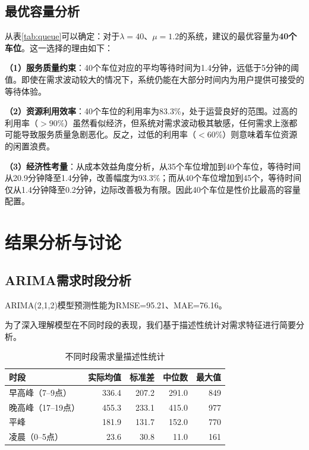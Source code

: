 \documentclass[12pt,a4paper]{article}
\begin{document}
\subsection{最优容量分析}

从表\ref{tab:queue}可以确定：对于$\lambda=40$、$\mu=1.2$的系统，建议的最优容量为\textbf{40个车位}。这一选择的理由如下：

\textbf{（1）服务质量约束}：40个车位对应的平均等待时间为1.4分钟，远低于5分钟的阈值。即使在需求波动较大的情况下，系统仍能在大部分时间内为用户提供可接受的等待体验。

\textbf{（2）资源利用效率}：40个车位的利用率为83.3\%，处于运营良好的范围。过高的利用率（$>90\%$）虽然看似经济，但系统对需求波动极其敏感，任何需求上涨都可能导致服务质量急剧恶化。反之，过低的利用率（$<60\%$）则意味着车位资源的闲置浪费。

\textbf{（3）经济性考量}：从成本效益角度分析，从35个车位增加到40个车位，等待时间从20.9分钟降至1.4分钟，改善幅度为93.3\%；而从40个车位增加到45个，等待时间仅从1.4分钟降至0.2分钟，边际改善极为有限。因此40个车位是性价比最高的容量配置。

\newpage


\section{结果分析与讨论}

\subsection{ARIMA需求时段分析}

ARIMA(2,1,2)模型预测性能为RMSE=95.21、MAE=76.16。

为了深入理解模型在不同时段的表现，我们基于描述性统计对需求特征进行简要分析。

\begin{table}[H]
\centering
\caption{不同时段需求量描述性统计}
\label{tab:period_statistics}
\small
\begin{tabular}{lrrrr}
\toprule
\textbf{时段} & \textbf{实际均值} & \textbf{标准差} & \textbf{中位数} & \textbf{最大值} \\
\midrule
早高峰（7--9点） & 336.4 & 207.2 & 291.0 & 849 \\
晚高峰（17--19点） & 455.3 & 233.1 & 415.0 & 977 \\
平峰 & 181.9 & 131.7 & 152.0 & 770 \\
凌晨（0--5点） & 23.6 & 30.8 & 11.0 & 161 \\
\bottomrule
\end{tabular}
\end{table}
\end{document}
